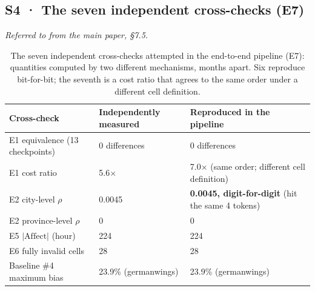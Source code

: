 \subsection*{S4 · The seven independent cross-checks (E7)}
\noindent\emph{Referred to from the main paper, \S7.5.}

\begin{table}[htbp]
\caption{The seven independent cross-checks attempted in the end-to-end
pipeline (E7): quantities computed by two different mechanisms, months apart.
Six reproduce bit-for-bit; the seventh is a cost ratio that agrees to the same
order under a different cell definition.}
\label{stab:crosscheck}
\centering
\small
\renewcommand{\arraystretch}{1.15}
\begin{tabular}{@{}p{}p{}p{}@{}}
\toprule
\textbf{Cross-check} & \textbf{Independently measured} & \textbf{Reproduced in the pipeline}\\
\midrule
E1 equivalence (13 checkpoints) & 0 differences & 0 differences\\
E1 cost ratio & 5.6$\times$ & 7.0$\times$ (same order; different cell definition)\\
E2 city-level $\rho$ & 0.0045 & \textbf{0.0045, digit-for-digit} (hit the same 4 tokens)\\
E2 province-level $\rho$ & 0 & 0\\
E5 $|\mathrm{Affect}|$ (hour) & 224 & 224\\
E6 fully invalid cells & 28 & 28\\
Baseline \#4 maximum bias & 23.9\% (germanwings) & 23.9\% (germanwings)\\
\bottomrule
\end{tabular}
\end{table}
